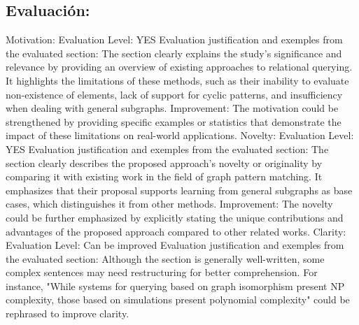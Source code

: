 \documentclass{article}%
\begin{document}
\subsection{Evaluación:}%
\label{subsec:Evaluacin}%
\newline%
Motivation:\newline%
Evaluation Level: YES\newline%
Evaluation justification and exemples from the evaluated section: The section clearly explains the study's significance and relevance by providing an overview of existing approaches to relational querying. It highlights the limitations of these methods, such as their inability to evaluate non{-}existence of elements, lack of support for cyclic patterns, and insufficiency when dealing with general subgraphs.\newline%
\newline%
Improvement: The motivation could be strengthened by providing specific examples or statistics that demonstrate the impact of these limitations on real{-}world applications.\newline%
\newline%
Novelty:\newline%
Evaluation Level: YES\newline%
Evaluation justification and exemples from the evaluated section: The section clearly describes the proposed approach's novelty or originality by comparing it with existing work in the field of graph pattern matching. It emphasizes that their proposal supports learning from general subgraphs as base cases, which distinguishes it from other methods.\newline%
\newline%
Improvement: The novelty could be further emphasized by explicitly stating the unique contributions and advantages of the proposed approach compared to other related works.\newline%
\newline%
Clarity:\newline%
Evaluation Level: Can be improved\newline%
Evaluation justification and exemples from the evaluated section: Although the section is generally well{-}written, some complex sentences may need restructuring for better comprehension. For instance, "While systems for querying based on graph isomorphism present NP complexity, those based on simulations present polynomial complexity" could be rephrased to improve clarity.\newline%
\newline%
\end{document}
